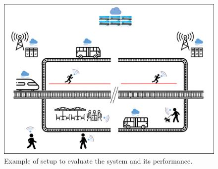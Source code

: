 \begin{figure}[h]
	\centering
	\includegraphics[width=.45\textwidth]{images/evaluation/evaluation.png}
	\caption{Example of setup to evaluate the system and its performance.}
	\label{fog_setup}
\end{figure}